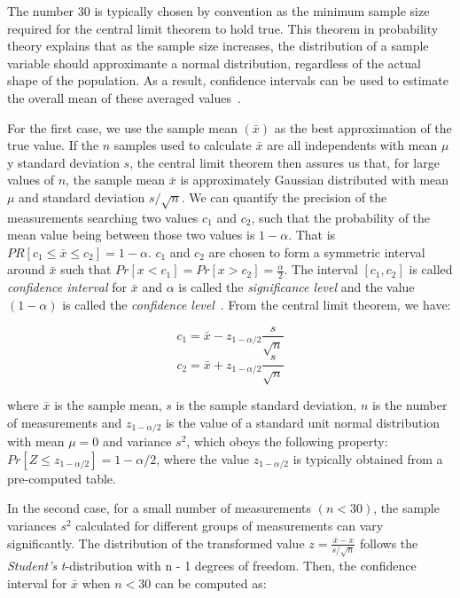 The number 30 is typically chosen by convention as the minimum sample size required for the central limit theorem to hold true. This theorem in probability theory explains that as the sample size increases, the distribution of a sample variable should approximante a normal distribution, regardless of the actual shape of the population. As a result, confidence intervals can be used to estimate the overall mean of these averaged values~\cite{DBLP_conf_oopsla_GeorgesBE07,lilja2005measuring}.

For the first case, we use the sample mean \((\bar{x})\) as the best approximation of the true value. If the \(n\) samples used to calculate \(\bar{x}\) are all independents with mean \(\mu\) y standard deviation \(s\), the central limit theorem then assures us that, for large values of \(n\), the sample mean \(\bar{x}\) is approximately Gaussian distributed with mean \(\mu\) and standard deviation \(s / \sqrt{n}\). We can quantify the precision of the measurements searching two values \(c_1\) and \(c_2\), such that the probability of the mean value being between those two values is \(1 - \alpha\). That is \(PR[c_1 \le \bar{x} \le c_2] = 1 - \alpha\). \(c_1\) and \(c_2\) are chosen to form a symmetric interval around \(\bar{x}\) such that \(Pr[x < c_1] = Pr[x > c_2] = \frac{\alpha}{2}\). The interval \([c_1, c_2]\) is called \textit{confidence interval} for \(\bar{x}\) and \(\alpha\) is called the \textit{significance level} and the value \((1 - \alpha)\) is called the \textit{confidence level}~\cite{DBLP_conf_oopsla_GeorgesBE07,lilja2005measuring}. From the central limit theorem, we have:

\begin{equation}
c_1 = \bar{x} - z_{1 - \alpha/2}\frac{s}{\sqrt{n}}
\end{equation}
\begin{equation}
c_2 = \bar{x} + z_{1 - \alpha/2}\frac{s}{\sqrt{n}}
\end{equation}

where \(\bar{x}\) is the sample mean, \(s\) is the sample standard deviation,
\(n\) is the number of measurements and \(z_{1 - \alpha/2}\) is the value of
a standard unit normal distribution with mean \(\mu = 0\) and variance
\(s^2\), which obeys the following property: \(Pr[Z \le z_{1-\alpha/2}] =
   1 - \alpha/2\), where the value \(z_{1 - \alpha/2}\) is typically obtained
from a pre-computed table.

In the second case, for a small number of measurements \((n < 30)\), the
sample variances \(s^2\) calculated for different groups of measurements can
vary significantly. The distribution of the transformed value \(z =
   \frac{\bar{x} - x}{s/\sqrt{n}}\) follows the \emph{Student's} \emph{t}-distribution
with n - 1 degrees of freedom. Then, the confidence interval for \(\bar{x}\)
when \(n < 30\) can be computed as:

